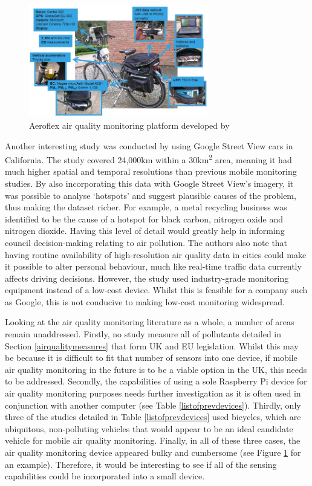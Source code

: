 \documentclass[11pt,twosided,a4paper]{report}
\begin{document}
\begin{figure}[!htb]
\centering
\includegraphics[width=0.7\textwidth]{aeroflex}
\caption{Aeroflex air quality monitoring platform developed by \cite{Elen2013aeroflex}}
\label{aeroflex}
\end{figure}

Another interesting study was conducted by \cite{Apte2017googlestreetview} using Google Street View cars in California. The study covered 24,000km within a 30km\textsuperscript{2} area, meaning it had much higher spatial and temporal resolutions than previous mobile monitoring studies. By also incorporating this data with Google Street View's imagery, it was possible to analyse `hotspots' and suggest plausible causes of the problem, thus making the dataset richer. For example, a metal recycling business was identified to be the cause of a hotspot for black carbon, nitrogen oxide and nitrogen dioxide. Having this level of detail would greatly help in informing council decision-making relating to air pollution. The authors also note that having routine availability of high-resolution air quality data in cities could make it possible to alter personal behaviour, much like real-time traffic data currently affects driving decisions. However, the study used industry-grade monitoring equipment instead of a low-cost device. Whilst this is feasible for a company such as Google, this is not conducive to making low-cost monitoring widespread. 

Looking at the air quality monitoring literature as a whole, a number of areas remain unaddressed. Firstly, no study measure all of pollutants detailed in Section \ref{airqualitymeasures} that form UK and EU legislation. Whilst this may be because it is difficult to fit that number of sensors into one device, if mobile air quality monitoring in the future is to be a viable option in the UK, this needs to be addressed. Secondly, the capabilities of using a sole Raspberry Pi device for air quality monitoring purposes needs further investigation as it is often used in conjunction with another computer (see Table \ref{listofprevdevices}). Thirdly, only three of the studies detailed in Table \ref{listofprevdevices} used bicycles, which are ubiquitous, non-polluting vehicles that would appear to be an ideal candidate vehicle for mobile air quality monitoring. Finally, in all of these three cases, the air quality monitoring device appeared bulky and cumbersome (see Figure \ref{aeroflex} for an example). Therefore, it would be interesting to see if all of the sensing capabilities could be incorporated into a small device.
\end{document}
